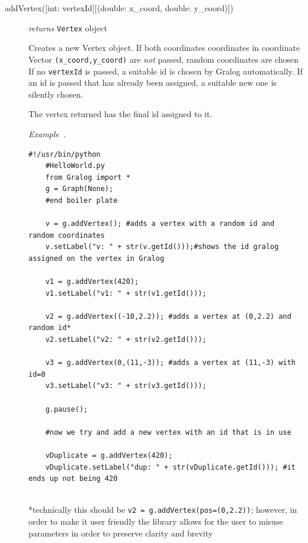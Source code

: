 \documentclass{article}
\newcounter{example}
\newenvironment{example}[1][]{\refstepcounter{example}\par\medskip
   \noindent \textit{Example~\theexample. #1} \rmfamily}{\medskip}
\begin{document}
\begin{description}
\item[addVertex({[int: vertexId]}{[(double: x\_coord, double: y\_coord)]})]\emph{returns}
  \texttt{Vertex} object

  Creates a new Vertex object. If both coordinates coordinates in coordinate Vector \texttt{(x\_coord,y\_coord)} are \textit{not} passed,
  random coordinates are chosen
  If no \texttt{vertexId} is passed, a suitable id is
  chosen by Gralog automatically. If an id is passed that has already
  been assigned, a suitable new one is silently chosen.
  
  The vertex returned has the final id assigned to it.

  \begin{example}
    \begin{lstlisting}[title={addVertex Example},label=addVertexExample]
    #!/usr/bin/python
    #HelloWorld.py
    from Gralog import *
    g = Graph(None);
    #end boiler plate
    
    v = g.addVertex(); #adds a vertex with a random id and random coordinates
    v.setLabel("v: " + str(v.getId()));#shows the id gralog assigned on the vertex in Gralog
    
    v1 = g.addVertex(420);
    v1.setLabel("v1: " + str(v1.getId()));
    
    v2 = g.addVertex((-10,2.2)); #adds a vertex at (0,2.2) and random id*
    v2.setLabel("v2: " + str(v2.getId()));
    
    v3 = g.addVertex(0,(11,-3)); #adds a vertex at (11,-3) with id=0
    v3.setLabel("v3: " + str(v3.getId()));
    
    g.pause();
    
    #now we try and add a new vertex with an id that is in use
    
    vDuplicate = g.addVertex(420);
    vDuplicate.setLabel("dup: " + str(vDuplicate.getId())); #it ends up not being 420
    
    \end{lstlisting}
    *technically this should be \texttt{v2 = g.addVertex(pos=(0,2.2))}; however, in order to make it user friendly the library allows for the user to misuse parameters in order to preserve clarity and brevity
  \end{example}
\end{description}
\end{document}
